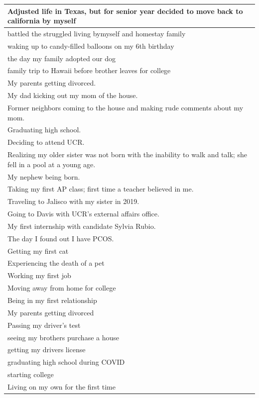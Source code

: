 \documentclass[
  .7em,
  letterpaper,
  DIV=11,
  numbers=noendperiod]{scrartcl}
\begin{document}
\begin{table}
\begin{tabular}{l}
\hline
Adjusted life in Texas, but for senior year decided to move back to california by myself\\
\hline
battled the struggled living bymyself and homestay family\\
\hline
waking up to candy-filled balloons on my 6th birthday\\
\hline
the day my family adopted our dog\\
\hline
family trip to Hawaii before brother leaves for college\\
\hline
My parents getting divorced.\\
\hline
My dad kicking out my mom of the house.\\
\hline
Former neighbors coming to the house and making rude comments about my mom.\\
\hline
Graduating high school.\\
\hline
Deciding to attend UCR.\\
\hline
Realizing my older sister was not born with the inability to walk and talk; she fell in a pool at a young age.\\
\hline
My nephew being born.\\
\hline
Taking my first AP class; first time a teacher believed in me.\\
\hline
Traveling to Jalisco with my sister in 2019.\\
\hline
Going to Davis with UCR's external affairs office.\\
\hline
My first internship with candidate Sylvia Rubio.\\
\hline
The day I found out I have PCOS.\\
\hline
Getting my first cat\\
\hline
Experiencing the death of a pet\\
\hline
Working my first job\\
\hline
Moving away from home for college\\
\hline
Being in my first relationship\\
\hline
My parents getting divorced\\
\hline
Passing my driver's test\\
\hline
seeing my brothers purchase a house\\
\hline
getting my drivers license\\
\hline
graduating high school during COVID\\
\hline
starting college\\
\hline
Living on my own for the first time\\

\end{tabular}
\end{table}
\end{document}
